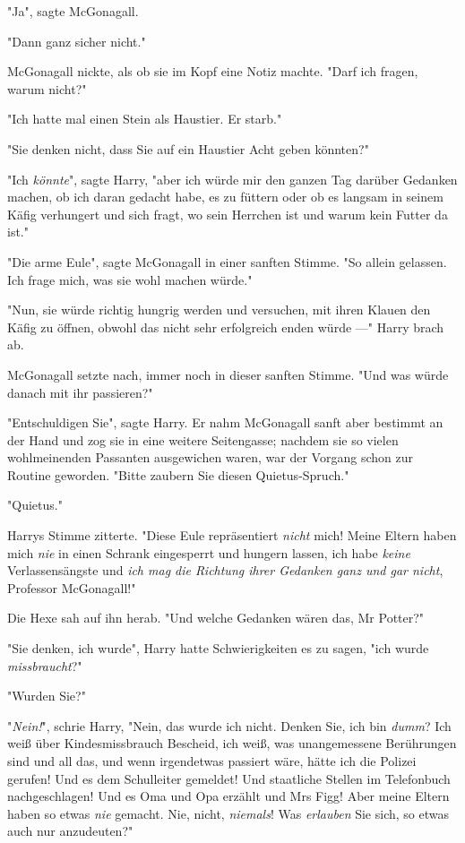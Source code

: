 {"Ja", sagte McGonagall.

"Dann ganz sicher nicht."

McGonagall nickte, als ob sie im Kopf eine Notiz machte. "Darf ich fragen, warum nicht?"

"Ich hatte mal einen Stein als Haustier. Er starb."

"Sie denken nicht, dass Sie auf ein Haustier Acht geben könnten?"

"Ich \emph{könnte}", sagte Harry, "aber ich würde mir den ganzen Tag darüber Gedanken machen, ob ich daran gedacht habe, es zu füttern oder ob es langsam in seinem Käfig verhungert und sich fragt, wo sein Herrchen ist und warum kein Futter da ist."

"Die arme Eule", sagte McGonagall in einer sanften Stimme. "So allein gelassen. Ich frage mich, was sie wohl machen würde."

"Nun, sie würde richtig hungrig werden und versuchen, mit ihren Klauen den Käfig zu öffnen, obwohl das nicht sehr erfolgreich enden würde ---" Harry brach ab.

McGonagall setzte nach, immer noch in dieser sanften Stimme. "Und was würde danach mit ihr passieren?"

"Entschuldigen Sie", sagte Harry. Er nahm McGonagall sanft aber bestimmt an der Hand und zog sie in eine weitere Seitengasse; nachdem sie so vielen wohlmeinenden Passanten ausgewichen waren, war der Vorgang schon zur Routine geworden. "Bitte zaubern Sie diesen Quietus-Spruch."

"Quietus."

Harrys Stimme zitterte. "Diese Eule repräsentiert \emph{nicht} mich! Meine Eltern haben mich \emph{nie} in einen Schrank eingesperrt und hungern lassen, ich habe \emph{keine} Verlassensängste und \emph{ich mag die Richtung ihrer Gedanken ganz und gar nicht}, Professor McGonagall!"

Die Hexe sah auf ihn herab. "Und welche Gedanken wären das, Mr Potter?"

"Sie denken, ich wurde", Harry hatte Schwierigkeiten es zu sagen, "ich wurde \emph{missbraucht}?"

"Wurden Sie?"

"\emph{Nein!}", schrie Harry, "Nein, das wurde ich nicht. Denken Sie, ich bin \emph{dumm}? Ich weiß über Kindesmissbrauch Bescheid, ich weiß, was unangemessene Berührungen sind und all das, und wenn irgendetwas passiert wäre, hätte ich die Polizei gerufen! Und es dem Schulleiter gemeldet! Und staatliche Stellen im Telefonbuch nachgeschlagen! Und es Oma und Opa erzählt und Mrs Figg! Aber meine Eltern haben so etwas \emph{nie} gemacht. Nie, nicht, \emph{niemals}! Was \emph{erlauben} Sie sich, so etwas auch nur anzudeuten?"

}
